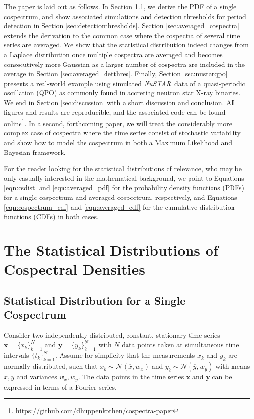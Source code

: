 \documentclass[12pt]{emulateapj}
\newcommand{\project}[1]{\textsl{#1}}
\newcommand{\nustar}{\project{NuSTAR}\xspace}
\begin{document}
The paper is laid out as follows. In Section \ref{sec:single_cospectrum}, we derive the PDF of a single cospectrum, and show associated simulations and detection thresholds for period detection in Section \ref{sec:detectionthresholds}. Section \ref{sec:averaged_cospectra} extends the derivation to the common case where the cospectra of several time series are averaged. We show that the statistical distribution indeed changes from a Laplace distribution once multiple cospectra are averaged and becomes consecutively more Gaussian as a larger number of cospectra are included in the average in Section \ref{sec:averaged_detthres}. Finally, Section \ref{sec:nustarqpo} presents a real-world example using simulated \nustar\ data of a quasi-periodic oscillation (QPO) as commonly found in accreting neutron star X-ray binaries. We end in Section \ref{sec:discussion} with a short discussion and conclusion. All figures and results are reproducible, and the associated code can be found online\footnote{\url{https://github.com/dhuppenkothen/cospectra-paper}}.
In a second, forthcoming paper, we will treat the considerably more complex case of cospectra where the time series consist of stochastic variability and show how to model the cospectrum in both a Maximum Likelihood and Bayesian framework.

For the reader looking for the statistical distributions of relevance, who may be only casually interested in the mathematical background, we point to Equations \ref{eqn:csdist} and \ref{eqn:averaged_pdf} for the probability density functions (PDFs) for a single cospectrum and averaged cospectrum, respectively, and Equations \ref{eqn:cospectrum_cdf} and \ref{eqn:averaged_cdf} for the cumulative distribution functions (CDFs) in both cases.


\section{The Statistical Distributions of Cospectral Densities}
\label{sec:whitenoise_cospectra}

\subsection{Statistical Distribution for a Single Cospectrum}
\label{sec:single_cospectrum}
Consider two independently distributed, constant, stationary time series $\mathbf{x} = \{x_k\}_{k=1}^N$ and $\mathbf{y} = \{y_k\}_{k=1}^N$ with $N$ data points taken at simultaneous time intervals $\{t_k\}_{k=1}^N$. Assume for simplicity that the measurements $x_k$ and $y_k$ are normally distributed, such that $x_k \sim \mathcal{N}(\overline{x}, w_x)$ and $y_k \sim \mathcal{N}(\overline{y}, w_y)$ with means $\overline{x}, \overline{y}$ and variances $w_x, w_y$. The data points in the time series $\mathbf{x}$ and $\mathbf{y}$ can be expressed in terms of a Fourier series,
\end{document}
